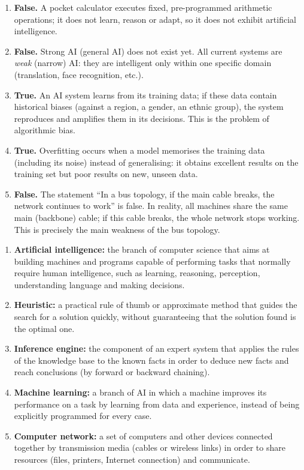 \documentclass[11pt]{article}
\newcommand{\cle}[1]{{\popxbold\color{popdark}#1}}
\begin{document}
\begin{corrige}
\begin{enumerate}
\item \textbf{False.} A pocket calculator executes fixed, pre-programmed arithmetic operations; it does not learn, reason or adapt, so it does not exhibit artificial intelligence.
\item \textbf{False.} Strong AI (general AI) does not exist yet. All current systems are \emph{weak} (narrow) AI: they are intelligent only within one specific domain (translation, face recognition, etc.).
\item \textbf{True.} An AI system learns from its training data; if these data contain historical biases (against a region, a gender, an ethnic group), the system reproduces and amplifies them in its decisions. This is the problem of \cle{algorithmic bias}.
\item \textbf{True.} \cle{Overfitting} occurs when a model memorises the training data (including its noise) instead of generalising: it obtains excellent results on the training set but poor results on new, unseen data.
\item \textbf{False.} The statement ``In a bus topology, if the main cable breaks, the network continues to work'' is false. In reality, all machines share the same main (backbone) cable; if this cable breaks, the whole network stops working. This is precisely the main weakness of the bus topology.
\end{enumerate}
\end{corrige}

\begin{corrige}
\begin{enumerate}
\item \textbf{Artificial intelligence:} the branch of computer science that aims at building machines and programs capable of performing tasks that normally require human intelligence, such as learning, reasoning, perception, understanding language and making decisions.
\item \textbf{Heuristic:} a practical rule of thumb or approximate method that guides the search for a solution quickly, without guaranteeing that the solution found is the optimal one.
\item \textbf{Inference engine:} the component of an expert system that applies the rules of the knowledge base to the known facts in order to deduce new facts and reach conclusions (by forward or backward chaining).
\item \textbf{Machine learning:} a branch of AI in which a machine improves its performance on a task by learning from data and experience, instead of being explicitly programmed for every case.
\item \textbf{Computer network:} a set of computers and other devices connected together by transmission media (cables or wireless links) in order to share resources (files, printers, Internet connection) and communicate.
\end{enumerate}
\end{corrige}
\end{document}
